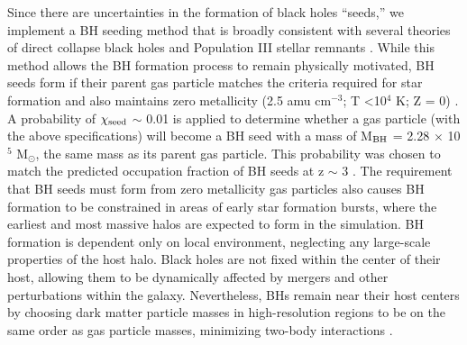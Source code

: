 \documentclass[12pt,headA,chapB]{fiskthesis}
\begin{document}
Since there are uncertainties in the formation of black holes ``seeds,'' we implement a BH seeding method that is broadly consistent with several theories of direct collapse black holes \citep{Couchman1986, Abel2002, Bromm2004} and Population III stellar remnants \citep{Loeb1994, Eisenstein1995, Koushiappas2004, Begelman2006, Lodato2006}. While this method allows the BH formation process to remain physically motivated, BH seeds form if their parent gas particle matches the criteria required for star formation and also maintains zero metallicity (2.5 amu cm$^{-3}$; T \textless 10$^4$ K; Z = 0) \citep{Stinson2006}. A probability of $\chi_{\rm seed}$ $\sim$ 0.01 is applied to determine whether a gas particle (with the above specifications) will become a BH seed with a mass of M$_{\rm BH}$ = 2.28 $\times$ 10$^5$ M$_{\odot}$, the same mass as its parent gas particle. This probability was chosen to match the predicted occupation fraction of BH seeds at z $\sim$ 3 \citep{Volonteri2008}.
The requirement that BH seeds must form from zero metallicity gas particles also causes BH formation to be constrained in areas of early star formation bursts, where the earliest and most massive halos are expected to form in the simulation. BH formation is dependent only on local environment, neglecting any large-scale properties of the host halo. Black holes are not fixed within the center of their host, allowing them to be dynamically affected by mergers and other perturbations within the galaxy. Nevertheless, BHs remain near their host centers by choosing dark matter particle masses in high-resolution regions to be on the same order as gas particle masses, minimizing two-body interactions \citep{Bellovary2011}.
\end{document}
